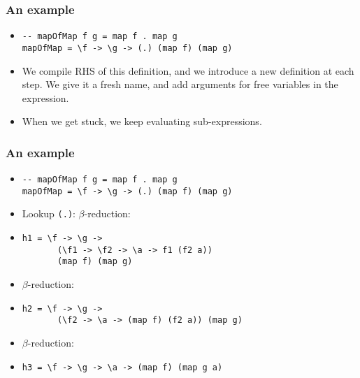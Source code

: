 \documentclass{beamer}
\begin{document}
\begin{frame}[fragile]

    \frametitle{An example}

    \begin{itemize}[<+->]
        \item[]
            \begin{verbatim}
-- mapOfMap f g = map f . map g
mapOfMap = \f -> \g -> (.) (map f) (map g)
            \end{verbatim}

        \item[]
            We compile RHS of this definition, and we introduce a new definition
            at each step. We give it a fresh name, and add arguments for free
            variables in the expression.

        \item[]
            When we get stuck, we keep evaluating sub-expressions.

    \end{itemize}

\end{frame}

\begin{frame}[fragile]

    \frametitle{An example}

    \begin{itemize}[<+->]

        \item[]
            \begin{verbatim}
-- mapOfMap f g = map f . map g
mapOfMap = \f -> \g -> (.) (map f) (map g)
            \end{verbatim}

        \item[]
            Lookup \texttt{(.)}:
            $\beta$-reduction:

        \item[]
            \begin{verbatim}
h1 = \f -> \g ->
       (\f1 -> \f2 -> \a -> f1 (f2 a))
       (map f) (map g)
            \end{verbatim}

        \item[]
            $\beta$-reduction:

        \item[]
            \begin{verbatim}
h2 = \f -> \g ->
       (\f2 -> \a -> (map f) (f2 a)) (map g)
            \end{verbatim}

        \item[]
            $\beta$-reduction:

        \item[]
            \begin{verbatim}
h3 = \f -> \g -> \a -> (map f) (map g a)
            \end{verbatim}

    \end{itemize}

\end{frame}
\end{document}

